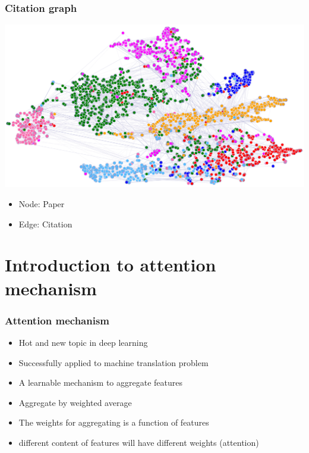 \documentclass[compress]{beamer}
\begin{document}
\begin{frame}
  \frametitle{Citation graph}
  \begin{center}
    \includegraphics[scale=0.10]{citation.png}
  \end{center}
  \begin{itemize}
  \item Node: Paper
  \item Edge: Citation
  \end{itemize}
\end{frame}
\section{Introduction to attention mechanism}

\begin{frame}
\frametitle{Attention mechanism}
\begin{itemize}
\item Hot and new topic in deep learning
\item Successfully applied to machine translation problem
\item A learnable mechanism to aggregate features
\item Aggregate by weighted average
\item The weights for aggregating is a function of features
\item different content of features will have different weights (attention)
\end{itemize}
\end{frame}
\end{document}
